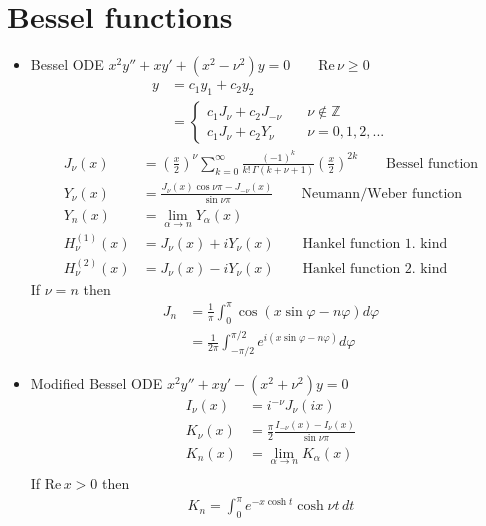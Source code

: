 \documentclass[10pt,a4paper]{book}
\theoremstyle{definition}
\begin{document}
\section{Bessel functions}
\begin{itemize}
\item Bessel ODE $x^2y''+xy'+(x^2-\nu^2)y=0\qquad \text{Re}\,\nu\ge0$
\begin{align}
y&=c_1y_1+c_2y_2\\
&=\left\{\begin{array}{ll}
c_1J_\nu+c_2J_{-\nu} &  \quad\nu\notin\mathbb{Z}\\
c_1J_\nu+c_2Y_{\nu}  &  \quad\nu=0,1,2,...
\end{array}\right.
\end{align}
\begin{align}
J_\nu(x)&=\left(\frac{x}{2}\right)^\nu\sum_{k=0}^\infty\frac{(-1)^k}{k!\,\Gamma(k+\nu+1)}\left(\frac{x}{2}\right)^{2k}\qquad\text{Bessel function}\\
Y_\nu(x)&=\frac{J_\nu(x)\cos\nu\pi-J_{-\nu}(x)}{\sin\nu\pi}\qquad\text{Neumann/Weber function}\\
Y_n(x)&=\lim_{\alpha\rightarrow n}Y_{\alpha}(x)\\
H_\nu^{(1)}(x)&=J_\nu(x)+iY_\nu(x)\qquad\text{Hankel function 1. kind}\\
H_\nu^{(2)}(x)&=J_\nu(x)-iY_\nu(x)\qquad\text{Hankel function 2. kind}
\end{align}
If $\nu=n$ then 
\begin{align}
J_n
&=\frac{1}{\pi}\int_0^\pi\cos(x\sin\varphi-n\varphi)d\varphi\\
&=\frac{1}{2\pi}\int_{-\pi/2}^{\pi/2}e^{i(x\sin\varphi-n\varphi)}d\varphi
\end{align}

\item Modified Bessel ODE $x^2y''+xy'-(x^2+\nu^2)y=0$
\begin{align}
I_\nu(x)&=i^{-\nu}J_\nu(ix)\\
K_\nu(x)&=\frac{\pi}{2}\frac{I_{-\nu}(x)-I_{\nu}(x)}{\sin\nu\pi}\\
K_n(x)&=\lim_{\alpha\rightarrow n}K_{\alpha}(x)\\
\end{align}
If $\text{Re}\,x>0$ then 
\begin{align}
K_n=\int_0^\pi e^{-x\cosh t}\cosh\nu t\,dt
\end{align}

\end{itemize}
\end{document}
